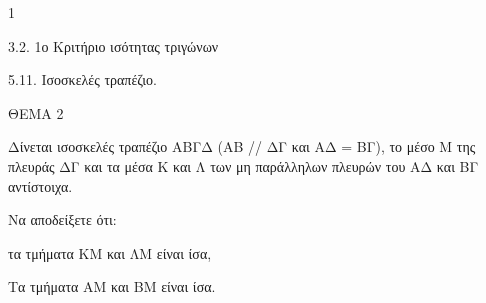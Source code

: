 \begin{ylh}{1}
    \item 3.2. 1ο Κριτήριο ισότητας τριγώνων
    \item 5.11. Ισοσκελές τραπέζιο.
\end{ylh}

ΘΕΜΑ 2

Δίνεται ισοσκελές τραπέζιο ΑΒΓΔ (ΑΒ // ΔΓ και ΑΔ = ΒΓ), το μέσο Μ της πλευράς ΔΓ και τα μέσα Κ και Λ των μη παράλληλων πλευρών του ΑΔ και ΒΓ αντίστοιχα.

Να αποδείξετε ότι:

\begin{alist}
\item τα τμήματα ΚΜ και ΛΜ είναι ίσα, 

\item Τα τμήματα ΑΜ και ΒΜ είναι ίσα. 


\begin{center}
\end{center}
\end{alist}
